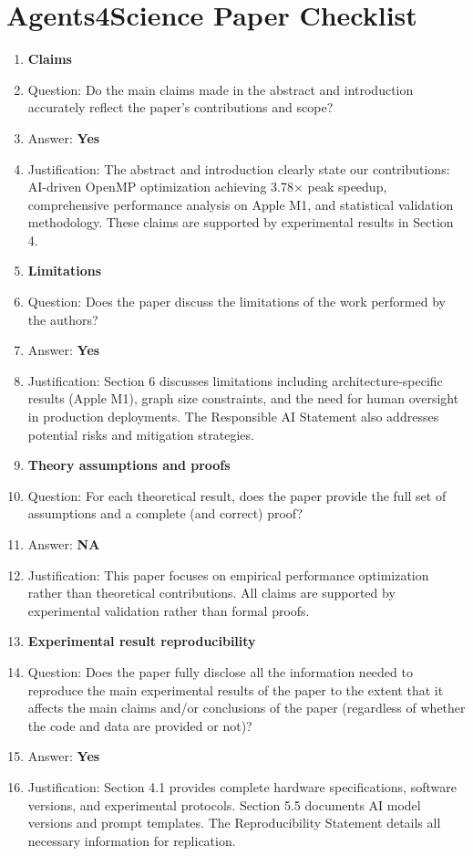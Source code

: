 \section*{Agents4Science Paper Checklist}

\begin{enumerate}

\item {\bf Claims}
    \item[] Question: Do the main claims made in the abstract and introduction accurately reflect the paper's contributions and scope?
    \item[] Answer: \textbf{Yes}
    \item[] Justification: The abstract and introduction clearly state our contributions: AI-driven OpenMP optimization achieving 3.78× peak speedup, comprehensive performance analysis on Apple M1, and statistical validation methodology. These claims are supported by experimental results in Section 4.

\item {\bf Limitations}
    \item[] Question: Does the paper discuss the limitations of the work performed by the authors?
    \item[] Answer: \textbf{Yes}
    \item[] Justification: Section 6 discusses limitations including architecture-specific results (Apple M1), graph size constraints, and the need for human oversight in production deployments. The Responsible AI Statement also addresses potential risks and mitigation strategies.

\item {\bf Theory assumptions and proofs}
    \item[] Question: For each theoretical result, does the paper provide the full set of assumptions and a complete (and correct) proof?
    \item[] Answer: \textbf{NA}
    \item[] Justification: This paper focuses on empirical performance optimization rather than theoretical contributions. All claims are supported by experimental validation rather than formal proofs.

\item {\bf Experimental result reproducibility}
    \item[] Question: Does the paper fully disclose all the information needed to reproduce the main experimental results of the paper to the extent that it affects the main claims and/or conclusions of the paper (regardless of whether the code and data are provided or not)?
    \item[] Answer: \textbf{Yes}
    \item[] Justification: Section 4.1 provides complete hardware specifications, software versions, and experimental protocols. Section 5.5 documents AI model versions and prompt templates. The Reproducibility Statement details all necessary information for replication.


\end{enumerate}
